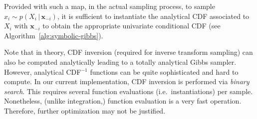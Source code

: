 \documentclass[]{article}
\newcommand{\bvec}[1]{\textbf{#1}}
\newcommand{\pr}{p}
\begin{document}
Provided with such a map, in the actual sampling process, 
to sample $x_i \sim \pr(X_i \,|\, \bvec{x}_{-i})$,
it is sufficient to instantiate the analytical CDF associated to $X_i$ with  
$\bvec{x}_{-i}$ to obtain the appropriate univariate conditional CDF
(see Algorithm~\ref{alg:symbolic-gibbs}).

Note that in theory, CDF inversion (required for inverse transform sampling)
can also be computed analytically leading to a totally analytical Gibbs sampler.
However, analytical CDF$^{-1}$ functions can be quite sophisticated and hard to compute. 
In our current implementation, CDF inversion is performed via \emph{binary search}. This requires several function evaluations (i.e.\ instantiations) per sample. Nonetheless, (unlike integration,) function evaluation is a very fast operation. Therefore, further optimization may not be justified.    



\end{document}
